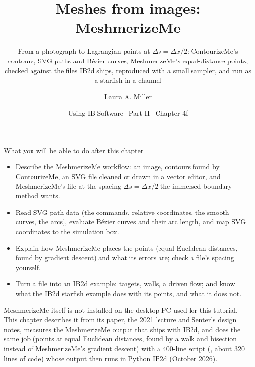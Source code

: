 \documentclass[aspectratio=169,11pt]{beamer}
\title[IB2d: meshes from images]{Meshes from images: MeshmerizeMe}
\subtitle{From a photograph to Lagrangian points at $\Delta s = \Delta x/2$: ContourizeMe's contours, SVG paths and B\'ezier curves, MeshmerizeMe's equal-distance points; checked against the files IB2d ships, reproduced with a small sampler, and run as a starfish in a channel}
\author[Miller]{Laura A. Miller}
\institute[UArizona]{Department of Mathematics, University of Arizona}
\date{Using IB Software \textbullet\ Part II \textbullet\ Chapter 4f}
\begin{document}
\begin{frame}[plain]
\end{frame}

\begin{frame}{What you will be able to do after this chapter}
\label{fr:goals}
\footnotesize
\begin{itemize}
  \item Describe the MeshmerizeMe workflow: an image, contours found by ContourizeMe, an SVG file cleaned or drawn in a vector editor, and MeshmerizeMe's  file at the spacing $\Delta s = \Delta x/2$ the immersed boundary method wants.
  \item Read SVG path data (the commands, relative coordinates, the smooth curves, the arcs), evaluate B\'ezier curves and their arc length, and map SVG coordinates to the simulation box.
  \item Explain how MeshmerizeMe places the points (equal Euclidean distances, found by gradient descent) and what its errors are; check a  file's spacing yourself.
  \item Turn a  file into an IB2d example: targets, walls, a driven flow; and know what the IB2d starfish example does with its points, and what it does not.
\end{itemize}
\begin{punchbox}
\small MeshmerizeMe itself is not installed on the desktop PC used for this tutorial. This chapter describes it from its paper, the 2021 lecture and Senter's design notes, measures the MeshmerizeMe output that ships with IB2d, and does the same job (points at equal Euclidean distances, found by a walk and bisection instead of MeshmerizeMe's gradient descent) with a 400-line script (, about 320 lines of code) whose output then runs in Python IB2d (October 2026).
\end{punchbox}
\end{frame}
\end{document}
